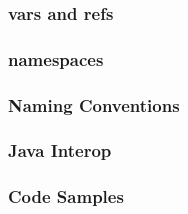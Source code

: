 \documentclass{beamer}
\begin{document}
\begin{frame}
  \frametitle{vars and refs}
\end{frame}

\begin{frame}
  \frametitle{namespaces}
\end{frame}

\begin{frame}
  \frametitle{Naming Conventions}
\end{frame}

\begin{frame}
  \frametitle{Java Interop}
  
\end{frame}

\begin{frame}
  \frametitle{Code Samples} 
   

\end{frame}  
\end{document}
